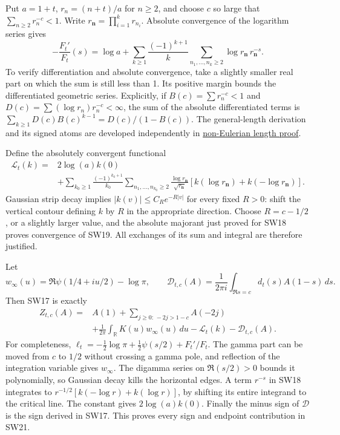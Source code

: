 \documentclass[
  10pt,
  a4paper,
]{article}
\begin{document}
Put \(a=1+t\), \(r_n=(n+t)/a\) for \(n\ge2\), and choose \(c\) so large
that \(\sum_{n\ge2}r_n^{-c}<1\). Write
\(r_{\boldsymbol n}=\prod_{i=1}^k r_{n_i}\). Absolute convergence of the
logarithm series gives \[
-\frac{F_t'}{F_t}(s)=\log a+
\sum_{k\ge1}\frac{(-1)^{k+1}}k
\sum_{n_1,\ldots,n_k\ge2}
\log r_{\boldsymbol n}\,r_{\boldsymbol n}^{-s}.
\tag{SW18}
\] To verify differentiation and absolute convergence, take a slightly
smaller real part on which the sum is still less than 1. Its positive
margin bounds the differentiated geometric series. Explicitly, if
\(B(c)=\sum r_n^{-c}<1\) and \(D(c)=\sum(\log r_n)r_n^{-c}<\infty\), the
sum of the absolute differentiated terms is
\(\sum_{k\ge1}D(c)B(c)^{k-1}=D(c)/(1-B(c))\). The general-length
derivation and its signed atoms are developed independently in
\href{https://github.com/KokunoYumeto/zeta-function-research-reader/blob/173dbc6ed5a03235dbe7654f928f3692107db39b/workbenches/splitzero-tandem/branches/tau-zero-prime-positivity/NON_EULERIAN_LENGTH_DERIVATION.md}{non-Eulerian
length proof}.

Define the absolutely convergent functional \[
\begin{aligned}
\mathcal L_t(k)={}&2\log(a)k(0)\\
&+\sum_{k_0\ge1}\frac{(-1)^{k_0+1}}{k_0}
\sum_{n_1,\ldots,n_{k_0}\ge2}
\frac{\log r_{\boldsymbol n}}{\sqrt{r_{\boldsymbol n}}}
\left[k(\log r_{\boldsymbol n})+k(-\log r_{\boldsymbol n})\right].
\end{aligned}
\tag{SW19}
\] Gaussian strip decay implies \(|k(v)|\le C_R e^{-R|v|}\) for every
fixed \(R>0\): shift the vertical contour defining \(k\) by \(R\) in the
appropriate direction. Choose \(R=c-1/2\), or a slightly larger value,
and the absolute majorant just proved for SW18 proves convergence of
SW19. All exchanges of its sum and integral are therefore justified.

Let \[
w_\infty(u)=\Re\psi(1/4+iu/2)-\log\pi,\qquad
\mathcal D_{t,c}(A)=\frac1{2\pi i}\int_{\Re s=c}d_t(s)A(1-s)\,ds.
\tag{SW20}
\] Then SW17 is exactly \[
\boxed{\begin{aligned}
Z_{t,c}(A)={}&A(1)+\sum_{j\ge0:\,-2j>1-c}A(-2j)\\
&+\frac1{2\pi}\int_{\mathbb R}K(u)w_\infty(u)\,du
-\mathcal L_t(k)-\mathcal D_{t,c}(A).
\end{aligned}}
\tag{SW21}
\] For completeness,
\(\ell_t=-\tfrac12\log\pi+\tfrac12\psi(s/2)+F_t'/F_t\). The gamma part
can be moved from \(c\) to \(1/2\) without crossing a gamma pole, and
reflection of the integration variable gives \(w_\infty\). The digamma
series on \(\Re(s/2)>0\) bounds it polynomially, so Gaussian decay kills
the horizontal edges. A term \(r^{-s}\) in SW18 integrates to
\(r^{-1/2}[k(-\log r)+k(\log r)]\), by shifting its entire integrand to
the critical line. The constant gives \(2\log(a)k(0)\). Finally the
minus sign of \(\mathcal D\) is the sign derived in SW17. This proves
every sign and endpoint contribution in SW21.
\end{document}
